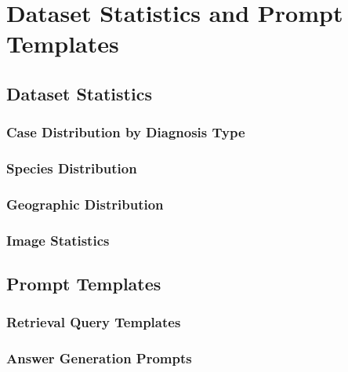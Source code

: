 \chapter{Dataset Statistics and Prompt Templates}
\label{ch:appendix:dataset}

%
%
\section{Dataset Statistics}
\label{sec:appendix:dataset:stats}

\subsection{Case Distribution by Diagnosis Type}
\label{subsec:appendix:dataset:stats:diagnosis}

\subsection{Species Distribution}
\label{subsec:appendix:dataset:stats:species}

\subsection{Geographic Distribution}
\label{subsec:appendix:dataset:stats:geography}

\subsection{Image Statistics}
\label{subsec:appendix:dataset:stats:images}

%
%
\section{Prompt Templates}
\label{sec:appendix:prompts}

\subsection{Retrieval Query Templates}
\label{subsec:appendix:prompts:retrieval}

\subsection{Answer Generation Prompts}
\label{subsec:appendix:prompts:generation}

